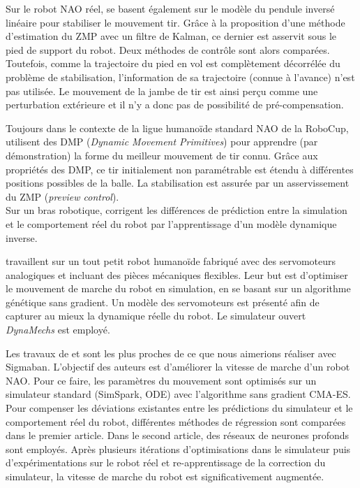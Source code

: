 Sur le robot NAO réel, \cite{wenk_online_2014} se basent également
sur le modèle du pendule inversé linéaire pour stabiliser le mouvement tir.
Grâce à la proposition d'une méthode d'estimation du ZMP avec un filtre de Kalman,
ce dernier est asservit sous le pied de support du robot.
Deux méthodes de contrôle sont alors comparées.
Toutefois, comme la trajectoire du pied en vol est complètement décorrélée du problème
de stabilisation, l'information de sa trajectoire (connue à l'avance) n'est pas utilisée.
Le mouvement de la jambe de tir est ainsi perçu comme une perturbation extérieure
et il n'y a donc pas de possibilité de pré-compensation.

Toujours dans le contexte de la ligue humanoïde standard NAO de la RoboCup, 
\cite{bockmann_kick_2016} utilisent des DMP (\textit{Dynamic Movement Primitives})
pour apprendre (par démonstration) la forme du meilleur mouvement de tir connu.
Grâce aux propriétés des DMP, ce tir initialement non paramétrable est étendu 
à différentes positions possibles de la balle.
La stabilisation est assurée par un asservissement du ZMP (\textit{preview control}).\\

Sur un bras robotique, \cite{christiano_transfer_2016} corrigent les différences 
de prédiction entre la simulation et le comportement réel du robot par 
l'apprentissage d'un modèle dynamique inverse.

\cite{boeing_dynamic_2016} travaillent sur un tout petit robot humanoïde 
fabriqué avec des servomoteurs analogiques et incluant des pièces mécaniques flexibles. 
Leur but est d'optimiser le mouvement de marche du robot en simulation, en se basant
sur un algorithme génétique sans gradient.
Un modèle des servomoteurs est présenté afin de capturer au mieux la dynamique 
réelle du robot.
Le simulateur ouvert \textit{DynaMechs} est employé.

Les travaux de \cite{farchy_humanoid_2013} et \cite{hanna_grounded_2017}
sont les plus proches de ce que nous aimerions réaliser avec Sigmaban.
L'objectif des auteurs est d'améliorer la vitesse de marche d'un robot NAO.
Pour ce faire, les paramètres du mouvement sont optimisés sur un 
simulateur standard (SimSpark, ODE) avec l'algorithme sans gradient CMA-ES. 
Pour compenser les déviations existantes entre les prédictions du simulateur et le
comportement réel du robot, différentes méthodes de régression sont comparées 
dans le premier article. Dans le second article, des réseaux de neurones profonds 
sont employés.
Après plusieurs itérations d'optimisations dans le simulateur puis d'expérimentations sur
le robot réel et re-apprentissage de la correction du simulateur, la vitesse de marche
du robot est significativement augmentée.\\

